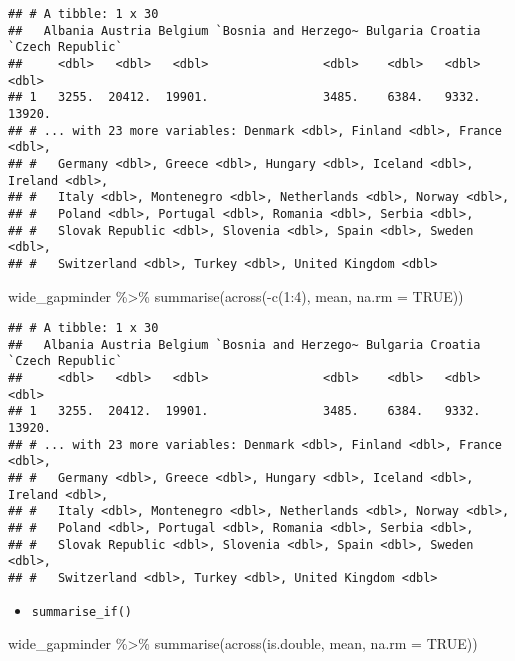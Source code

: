 \documentclass[
]{book}
\newenvironment{Shaded}{\begin{snugshade}}{\end{snugshade}}
\newcommand{\AttributeTok}[1]{\textcolor[rgb]{0.77,0.63,0.00}{#1}}
\newcommand{\ConstantTok}[1]{\textcolor[rgb]{0.00,0.00,0.00}{#1}}
\newcommand{\DecValTok}[1]{\textcolor[rgb]{0.00,0.00,0.81}{#1}}
\newcommand{\FunctionTok}[1]{\textcolor[rgb]{0.00,0.00,0.00}{#1}}
\newcommand{\NormalTok}[1]{#1}
\newcommand{\SpecialCharTok}[1]{\textcolor[rgb]{0.00,0.00,0.00}{#1}}
\providecommand{\tightlist}{%
  \setlength{\itemsep}{0pt}\setlength{\parskip}{0pt}}
\begin{document}
\begin{verbatim}
## # A tibble: 1 x 30
##   Albania Austria Belgium `Bosnia and Herzego~ Bulgaria Croatia `Czech Republic`
##     <dbl>   <dbl>   <dbl>                <dbl>    <dbl>   <dbl>            <dbl>
## 1   3255.  20412.  19901.                3485.    6384.   9332.           13920.
## # ... with 23 more variables: Denmark <dbl>, Finland <dbl>, France <dbl>,
## #   Germany <dbl>, Greece <dbl>, Hungary <dbl>, Iceland <dbl>, Ireland <dbl>,
## #   Italy <dbl>, Montenegro <dbl>, Netherlands <dbl>, Norway <dbl>,
## #   Poland <dbl>, Portugal <dbl>, Romania <dbl>, Serbia <dbl>,
## #   Slovak Republic <dbl>, Slovenia <dbl>, Spain <dbl>, Sweden <dbl>,
## #   Switzerland <dbl>, Turkey <dbl>, United Kingdom <dbl>
\end{verbatim}

\begin{Shaded}
\begin{Highlighting}[]
\NormalTok{wide\_gapminder }\SpecialCharTok{\%\textgreater{}\%}
  \FunctionTok{summarise}\NormalTok{(}\FunctionTok{across}\NormalTok{(}\SpecialCharTok{{-}}\FunctionTok{c}\NormalTok{(}\DecValTok{1}\SpecialCharTok{:}\DecValTok{4}\NormalTok{), mean, }\AttributeTok{na.rm =} \ConstantTok{TRUE}\NormalTok{))}
\end{Highlighting}
\end{Shaded}

\begin{verbatim}
## # A tibble: 1 x 30
##   Albania Austria Belgium `Bosnia and Herzego~ Bulgaria Croatia `Czech Republic`
##     <dbl>   <dbl>   <dbl>                <dbl>    <dbl>   <dbl>            <dbl>
## 1   3255.  20412.  19901.                3485.    6384.   9332.           13920.
## # ... with 23 more variables: Denmark <dbl>, Finland <dbl>, France <dbl>,
## #   Germany <dbl>, Greece <dbl>, Hungary <dbl>, Iceland <dbl>, Ireland <dbl>,
## #   Italy <dbl>, Montenegro <dbl>, Netherlands <dbl>, Norway <dbl>,
## #   Poland <dbl>, Portugal <dbl>, Romania <dbl>, Serbia <dbl>,
## #   Slovak Republic <dbl>, Slovenia <dbl>, Spain <dbl>, Sweden <dbl>,
## #   Switzerland <dbl>, Turkey <dbl>, United Kingdom <dbl>
\end{verbatim}

\begin{itemize}
\tightlist
\item
  \texttt{summarise\_if()}
\end{itemize}

\begin{Shaded}
\begin{Highlighting}[]
\NormalTok{wide\_gapminder }\SpecialCharTok{\%\textgreater{}\%}
  \FunctionTok{summarise}\NormalTok{(}\FunctionTok{across}\NormalTok{(is.double, mean, }\AttributeTok{na.rm =} \ConstantTok{TRUE}\NormalTok{))}
\end{Highlighting}
\end{Shaded}
\end{document}
